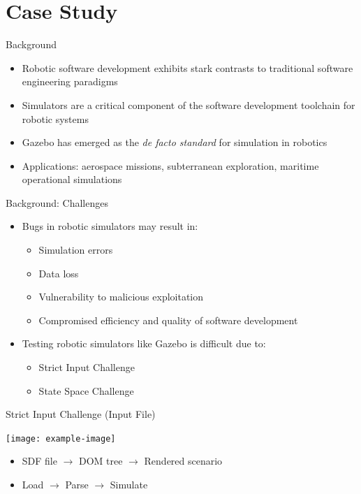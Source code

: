 \documentclass{beamer}
\begin{document}
\section{Case Study}
\begin{frame}{Background}
\begin{itemize}
\item Robotic software development exhibits stark contrasts to traditional software engineering paradigms
\item Simulators are a critical component of the software development toolchain for robotic systems
\item Gazebo has emerged as the \textit{de facto standard} for simulation in robotics
\item Applications: aerospace missions, subterranean exploration, maritime operational simulations
\end{itemize}
\end{frame}

\begin{frame}{Background: Challenges}
\begin{itemize}
\item Bugs in robotic simulators may result in:
  \begin{itemize}
  \item Simulation errors
  \item Data loss
  \item Vulnerability to malicious exploitation
  \item Compromised efficiency and quality of software development
  \end{itemize}
\item Testing robotic simulators like Gazebo is difficult due to:
  \begin{itemize}
  \item Strict Input Challenge
  \item State Space Challenge
  \end{itemize}
\end{itemize}
\end{frame}

\begin{frame}{Strict Input Challenge (Input File)}
\begin{center}
\texttt{[image: example-image]}
\end{center}
\begin{itemize}
\item SDF file $\rightarrow$ DOM tree $\rightarrow$ Rendered scenario
\item Load $\rightarrow$ Parse $\rightarrow$ Simulate
\end{itemize}
\end{frame}
\end{document}
